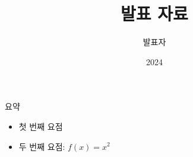 \documentclass{beamer}
\title{발표 자료}\author{발표자}\date{2024}
\begin{document}
\begin{frame}\titlepage\end{frame}
\begin{frame}{요약}
\begin{itemize}\item 첫 번째 요점 \item 두 번째 요점: $f(x)=x^2$ \end{itemize}
\end{frame}
\end{document}
